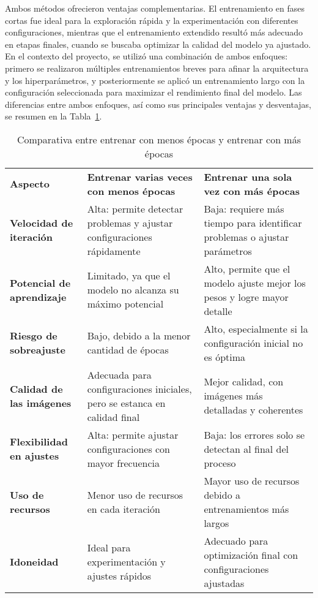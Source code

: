 Ambos métodos ofrecieron ventajas complementarias. El entrenamiento en fases cortas fue ideal para la exploración rápida y la experimentación con diferentes configuraciones, mientras que el entrenamiento extendido resultó más adecuado en etapas finales, cuando se buscaba optimizar la calidad del modelo ya ajustado. En el contexto del proyecto, se utilizó una combinación de ambos enfoques: primero se realizaron múltiples entrenamientos breves para afinar la arquitectura y los hiperparámetros, y posteriormente se aplicó un entrenamiento largo con la configuración seleccionada para maximizar el rendimiento final del modelo. Las diferencias entre ambos enfoques, así como sus principales ventajas y desventajas, se resumen en la Tabla~\ref{tab:comparacion_entrenamiento}.


\begin{table}[H]
\centering
\renewcommand{\arraystretch}{1.5}
\begin{tabular}{p{5cm}p{5cm}p{5cm}}
\rowcolor{gray!30}
\textbf{Aspecto} & \textbf{Entrenar varias veces con menos épocas} & \textbf{Entrenar una sola vez con más épocas} \\
\rowcolor{gray!10}
\textbf{Velocidad de iteración} & Alta: permite detectar problemas y ajustar configuraciones rápidamente & Baja: requiere más tiempo para identificar problemas o ajustar parámetros \\
\addlinespace
\textbf{Potencial de aprendizaje} & Limitado, ya que el modelo no alcanza su máximo potencial & Alto, permite que el modelo ajuste mejor los pesos y logre mayor detalle \\
\rowcolor{gray!10}
\textbf{Riesgo de sobreajuste} & Bajo, debido a la menor cantidad de épocas & Alto, especialmente si la configuración inicial no es óptima \\
\addlinespace
\textbf{Calidad de las imágenes} & Adecuada para configuraciones iniciales, pero se estanca en calidad final & Mejor calidad, con imágenes más detalladas y coherentes \\
\rowcolor{gray!10}
\textbf{Flexibilidad en ajustes} & Alta: permite ajustar configuraciones con mayor frecuencia & Baja: los errores solo se detectan al final del proceso \\
\addlinespace
\textbf{Uso de recursos} & Menor uso de recursos en cada iteración & Mayor uso de recursos debido a entrenamientos más largos \\
\rowcolor{gray!10}
\textbf{Idoneidad} & Ideal para experimentación y ajustes rápidos & Adecuado para optimización final con configuraciones ajustadas \\
\end{tabular}
\caption{Comparativa entre entrenar con menos épocas y entrenar con más épocas}
\label{tab:comparacion_entrenamiento}
\end{table}

